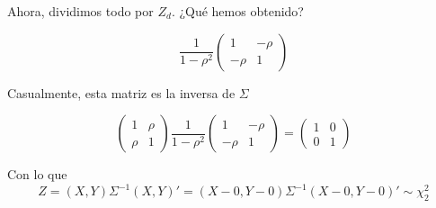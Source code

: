 \begin{problem}[3]
Ahora, dividimos todo por $Z_d$. ¿Qué hemos obtenido?

\[
\frac{1}{1-\rho^2}\begin{pmatrix}1&-\rho\\-\rho&1\end{pmatrix}
\]


Casualmente, esta matriz es la inversa de $Σ$

\[
\begin{pmatrix}1&\rho\\\rho&1\end{pmatrix}\frac{1}{1-\rho^2}\begin{pmatrix}1&-\rho\\-\rho&1\end{pmatrix} = \begin{pmatrix}1&0\\0&1\end{pmatrix}
\]

Con lo que \[Z = (X,Y)Σ^{-1}(X,Y)' = (X-0,Y-0)Σ^{-1}(X-0,Y-0)' \sim \chi^2_2\]

\end{problem}

